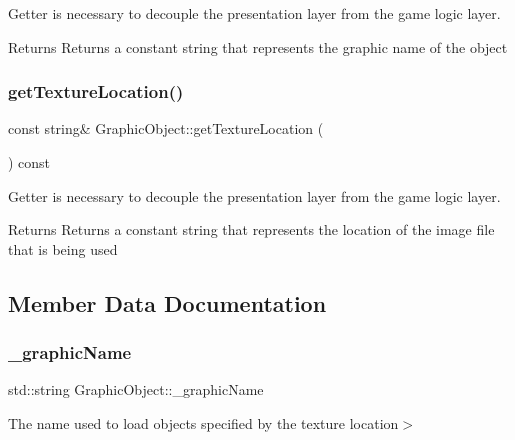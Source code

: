 Getter is necessary to decouple the presentation layer from the game logic layer. 

\begin{DoxyReturn}{Returns}
Returns a constant string that represents the graphic name of the object 
\end{DoxyReturn}
\mbox{\label{class_graphic_object_a1041a2dd82f82fc724675c5a2ea67d32}} 
\subsubsection{\texorpdfstring{get\+Texture\+Location()}{getTextureLocation()}}
{\footnotesize\ttfamily const string\& Graphic\+Object\+::get\+Texture\+Location (\begin{DoxyParamCaption}{ }\end{DoxyParamCaption}) const\hspace{0.3cm}{\ttfamily [inline]}}



Getter is necessary to decouple the presentation layer from the game logic layer. 

\begin{DoxyReturn}{Returns}
Returns a constant string that represents the location of the image file that is being used 
\end{DoxyReturn}


\subsection{Member Data Documentation}
\mbox{\label{class_graphic_object_a74c9292d37d9be9e099c868be084b33f}} 
\subsubsection{\texorpdfstring{\+\_\+graphic\+Name}{\_graphicName}}
{\footnotesize\ttfamily std\+::string Graphic\+Object\+::\+\_\+graphic\+Name\hspace{0.3cm}{\ttfamily [protected]}}

The name used to load objects specified by the texture location$>$ \mbox{\label{class_graphic_object_a3fc571887a6e46dda4a4ef10d44720b5}} 
